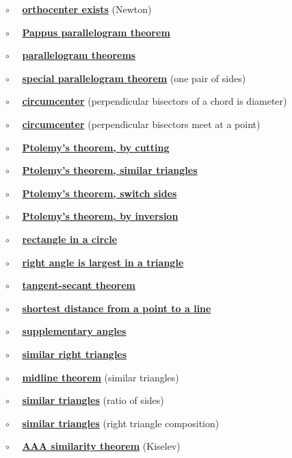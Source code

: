 \documentclass[11pt, oneside]{article}
\begin{document}
$\circ$ \ \ \hyperref[sec:Newton_altitude]{\textbf{orthocenter exists}}  (Newton)

$\circ$ \ \ \hyperref[sec:PProof_Pappus]{\textbf{Pappus parallelogram theorem}}

$\circ$ \ \ \hyperref[sec:diagonal_theorem]{\textbf{parallelogram theorems}}

$\circ$ \ \ \hyperref[sec:one_pair_of_sides]{\textbf{special parallelogram theorem}} (one pair of sides)

$\circ$ \ \ \hyperref[sec:perpendicular_bisector_of_a_chord]{\textbf{circumcenter}} (perpendicular bisectors of a chord is diameter)

$\circ$ \ \ \hyperref[sec:circumcenter]{\textbf{circumcenter}} (perpendicular bisectors meet at a point)

$\circ$ \ \ \hyperref[sec:Ptolemy]{\textbf{Ptolemy's theorem, by cutting}}

$\circ$ \ \ \hyperref[sec:Ptolemy_similar_triangles]{\textbf{Ptolemy's theorem, similar triangles}}

$\circ$ \ \ \hyperref[sec:Ptolemy_switch_sides]{\textbf{Ptolemy's theorem, switch sides}}

$\circ$ \ \ \hyperref[sec:Ptolemy_inversion]{\textbf{Ptolemy's theorem, by inversion}}

$\circ$ \ \ \hyperref[sec:rectangle_side_on_a_circle]{\textbf{rectangle in a circle}}

$\circ$ \ \ \hyperref[sec:right_angle_largest]{\textbf{right angle is largest in a triangle}}

$\circ$ \ \ \hyperref[sec:tangent_secant_theorem]{\textbf{tangent-secant theorem}}

$\circ$ \ \ \hyperref[sec:shortest_distance_to_line]{\textbf{shortest distance from a point to a line}}

$\circ$ \ \ \hyperref[sec:equal_supplementary_angles]{\textbf{supplementary angles}}

$\circ$ \ \ \hyperref[sec:similar_right_triangles]{\textbf{similar right triangles}}

$\circ$ \ \ \hyperref[sec:midline_theorem]{\textbf{midline theorem}} (similar triangles)

$\circ$ \ \  \hyperref[sec:similarity_equal_ratios]{\textbf{similar triangles}} (ratio of sides)

$\circ$ \ \  \hyperref[sec:similarity_right_to_all_triangles]{\textbf{similar triangles}} (right triangle composition)

$\circ$ \ \ \hyperref[sec:similarity_theorem]{\textbf{AAA similarity theorem}} (Kiselev)
\end{document}
